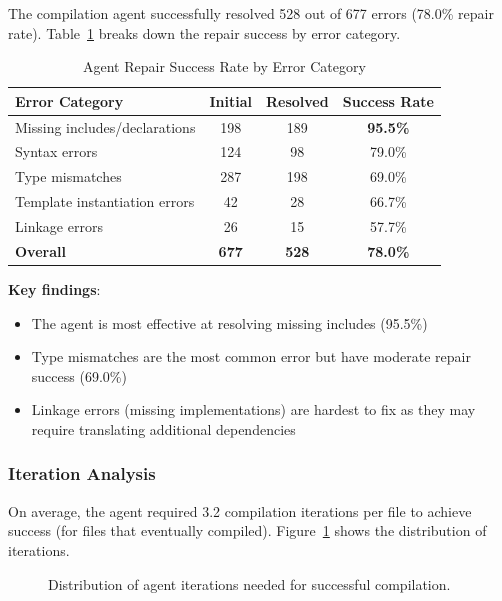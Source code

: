 The compilation agent successfully resolved 528 out of 677 errors (78.0\% repair rate). Table~\ref{tab:agent-effectiveness} breaks down the repair success by error category.

\begin{table}[h]
\centering
\caption{Agent Repair Success Rate by Error Category}
\label{tab:agent-effectiveness}
\begin{tabular}{lccc}
\toprule
\textbf{Error Category} & \textbf{Initial} & \textbf{Resolved} & \textbf{Success Rate} \\
\midrule
Missing includes/declarations & 198 & 189 & \textbf{95.5\%} \\
Syntax errors & 124 & 98 & 79.0\% \\
Type mismatches & 287 & 198 & 69.0\% \\
Template instantiation errors & 42 & 28 & 66.7\% \\
Linkage errors & 26 & 15 & 57.7\% \\
\midrule
\textbf{Overall} & \textbf{677} & \textbf{528} & \textbf{78.0\%} \\
\bottomrule
\end{tabular}
\end{table}

\textbf{Key findings}:
\begin{itemize}
\item The agent is most effective at resolving missing includes (95.5\%)
\item Type mismatches are the most common error but have moderate repair success (69.0\%)
\item Linkage errors (missing implementations) are hardest to fix as they may require translating additional dependencies
\end{itemize}

\subsubsection{Iteration Analysis}

On average, the agent required 3.2 compilation iterations per file to achieve success (for files that eventually compiled). Figure~\ref{fig:iteration-distribution} shows the distribution of iterations.

\begin{figure}[h]
\centering
{}
\caption{Distribution of agent iterations needed for successful compilation.}
\label{fig:iteration-distribution}
\end{figure}

